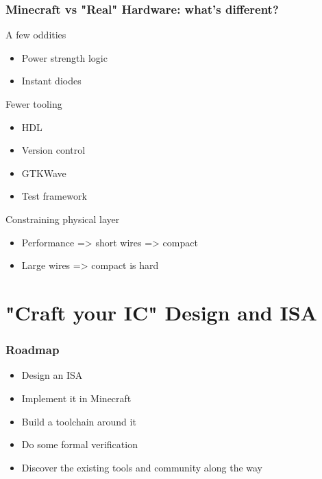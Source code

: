 \documentclass[aspectratio=169]{beamer}
\begin{document}
\begin{frame}
	\frametitle{Minecraft vs "Real" Hardware: what's different?}
	A few oddities
	\begin{itemize}
		\item Power strength logic
		\item Instant diodes
	\end{itemize}
	Fewer tooling
	\begin{itemize}
		\item HDL
		\item Version control
		\item GTKWave
		\item Test framework
	\end{itemize}
	Constraining physical layer
	\begin{itemize}
		\item Performance => short wires => compact
		\item Large wires => compact is hard
	\end{itemize}
\end{frame}

\section{"Craft your IC" Design and ISA}


\begin{frame}
	\frametitle{Roadmap}

	\begin{itemize}
		\item Design an ISA
		\item Implement it in Minecraft
		\item Build a toolchain around it
		\item Do some formal verification
		\item Discover the existing tools and community along the way
	\end{itemize}


\end{frame}
\end{document}
